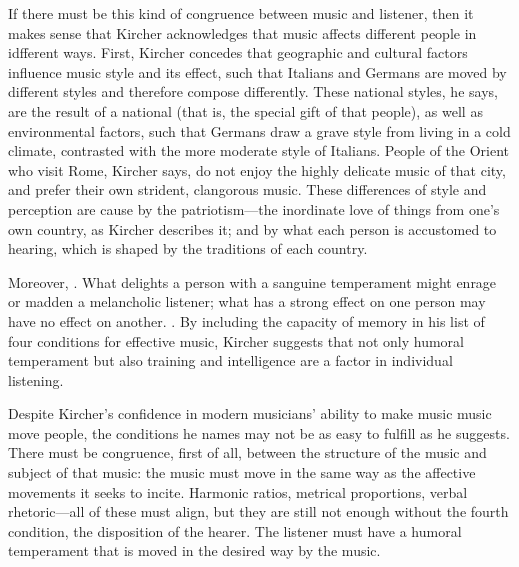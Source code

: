 If there must be this kind of congruence between music and listener, then it makes sense that Kircher acknowledges that music affects different people in idfferent ways.
First, Kircher concedes that geographic and cultural factors influence music style and its effect, such that Italians and Germans are moved by different styles and therefore compose differently.
These national styles, he says, are the result of a national  (that is, the special gift of that people), as well as environmental factors, such that Germans draw a grave style from living in a cold climate, contrasted with the more moderate style of Italians.
People of the Orient who visit Rome, Kircher says, do not enjoy the highly delicate music of that city, and prefer their own strident, clangorous music.
These differences of style and perception are cause by the patriotism---the inordinate love of things from one's own country, as Kircher describes it; and by what each person is accustomed to hearing, which is shaped by the traditions of each country.%
    \Autocite[543--544]{Kircher:Musurgia} %

Moreover, .%
    \Autocite
    [544: .]
    {Kircher:Musurgia}
What delights a person with a sanguine temperament might enrage or madden a melancholic listener; what has a strong effect on one person may have no effect on another.%
    \Autocite[550]{Kircher:Musurgia}
.%
    \Autocite[550: .]
    {Kircher:Musurgia}
By including the capacity of memory in his list of four conditions for effective music, Kircher suggests that not only humoral temperament but also training and intelligence are a factor in individual listening.

Despite Kircher's confidence in modern musicians' ability to make music music move people, the conditions he names may not be as easy to fulfill as he suggests.
There must be congruence, first of all, between the structure of the music and subject of that music: the music must move in the same way as the affective movements it seeks to incite.
Harmonic ratios, metrical proportions, verbal rhetoric---all of these must align, but they are still not enough without the fourth condition, the disposition of the hearer.
The listener must have a humoral temperament that is moved in the desired way by the music. 

